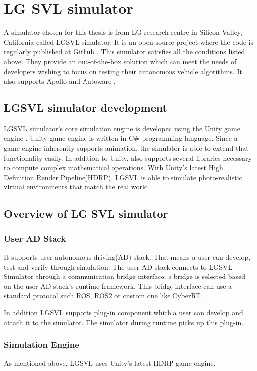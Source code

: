 \section{LG SVL simulator}
A simulator chosen for this thesis is from LG research centre in Silicon Valley,
California called LGSVL simulator. It is an open source project where the code is
regularly published at Github \cite{lgsvlgithub}. This simulator satisfies all the
conditions listed above. They provide an out-of-the-box solution which can meet the
needs of developers wishing to focus on testing their autonomous vehicle algorithms. It
also supports Apollo \cite{ApolloAuto} and Autoware \cite{autowarePaper}.

\subsection{LGSVL simulator development}
LGSVL simulator's core simulation engine is developed using the Unity game engine
\cite{unitygameengine}. Unity game engine is written in C\# programming language. Since a
game engine inherently supports animation, the simulator is able to extend that
functionality easily. In addition to Unity, also supports several libraries necessary to
compute complex mathematical operations. With Unity's latest High Definition Render
Pipeline(HDRP), LGSVL is able to simulate photo-realistic virtual environments that match
the real world.

\subsection{Overview of LG SVL simulator}

\subsubsection*{User AD Stack}
It supports user autonomous driving(AD) stack. That means a user can develop, test and verify through simulation.
The user AD stack connects to LGSVL Simulator through a communication bridge interface; a bridge is selected based
on the user AD stack’s runtime framework. This bridge interface can use a standard
protocol such ROS, ROS2 or custom one like CyberRT \cite{ApolloAuto}.

In addition LGSVL supports plug-in component which a user can develop and attach it to the
simulator. The simulator during runtime picks up this plug-in.

\subsubsection*{Simulation Engine}
As mentioned above, LGSVL uses Unity's latest HDRP game engine.

